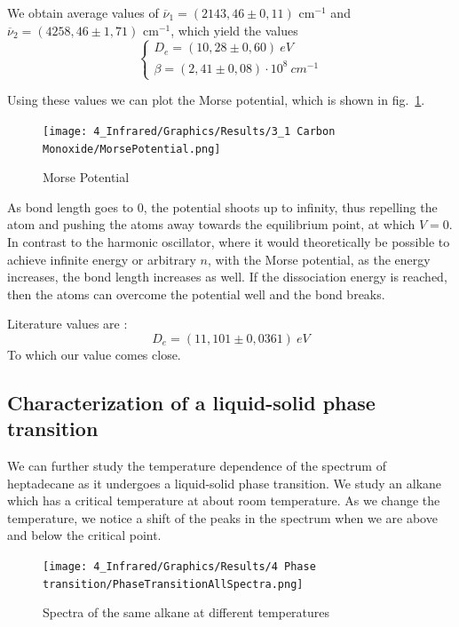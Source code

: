 \documentclass[12pt]{article}
\begin{document}
We obtain average values of $\overline{\nu}_1 = (2143,46 \pm 0,11)$ cm$^{-1}$ and $\overline{\nu}_2 = (4258,46 \pm 1,71)$ cm$^{-1}$, which yield the values
\begin{equation*}
    \begin{cases}
        D_e = (10,28 \pm 0,60) \ \si{eV} \\
        \beta = (2,41 \pm 0,08) \cdot 10^{8} \ \si{cm^{-1}}
    \end{cases}
\end{equation*}

Using these values we can plot the Morse potential, which is shown in fig.~\ref{fig:MorsePotential}. 

\begin{figure}[!ht]
    \centering
    \texttt{[image: 4\_Infrared/Graphics/Results/3\_1 Carbon Monoxide/MorsePotential.png]}
    \caption{Morse Potential}
    \label{fig:MorsePotential}
\end{figure}
\FloatBarrier
As bond length goes to 0, the potential shoots up to infinity, thus repelling the atom and pushing the atoms away towards the equilibrium point, at which $V = 0$. In contrast to the harmonic oscillator, where it would theoretically be possible to achieve infinite energy or arbitrary $n$, with the Morse potential, as the energy increases, the bond length increases as well. If the dissociation energy is reached, then the atoms can overcome the potential well and the bond breaks.

Literature values are \cite{doi:10.1021/ed073p804}:
\begin{equation*}
    D_e = (11,101 \pm 0,0361) \ \si{eV} 
\end{equation*}
To which our value comes close.

\subsection{Characterization of a liquid-solid phase transition}
We can further study the temperature dependence of the spectrum of heptadecane as it undergoes a liquid-solid phase transition.
We study an alkane which has a critical temperature at about room temperature. As we change the temperature, we notice a shift of the peaks in the spectrum when we are above and below the critical point.

\begin{figure}[!ht]
    \centering
    \texttt{[image: 4\_Infrared/Graphics/Results/4 Phase transition/PhaseTransitionAllSpectra.png]}
    \caption{Spectra of the same alkane at different temperatures}
    \label{fig:PhaseTransitionAllSpectra}
\end{figure}
\FloatBarrier
\end{document}
